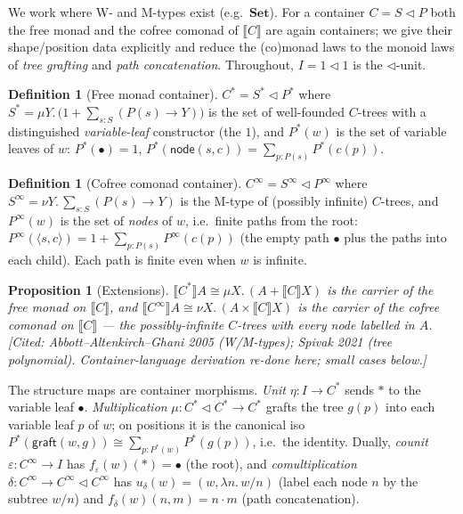 \documentclass[11pt,a4paper]{book}
\newcommand{\Set}{\mathbf{Set}}
\newcommand{\cont}[2]{#1 \triangleleft #2}
\newcommand{\Ext}[1]{\llbracket #1 \rrbracket}
\theoremstyle{plain}
\newtheorem{Proposition}[Theorem]{Proposition}
\theoremstyle{definition}
\newtheorem{Definition}[Theorem]{Definition}
\theoremstyle{remark}
\newcommand{\prov}[1]{\hfill\textsf{\footnotesize[#1]}}
\begin{document}
We work where W- and M-types exist (e.g.\ $\Set$). For a container $C=\cont SP$ both
the free monad and the cofree comonad of $\Ext C$ are again containers; we give their
shape/position data explicitly and reduce the (co)monad laws to the monoid laws of
\emph{tree grafting} and \emph{path concatenation}. Throughout, $I=\cont 11$ is the
$\triangleleft$-unit.

\begin{Definition}[Free monad container]\label{def:freemonad}
$C^{*}=\cont{S^{*}}{P^{*}}$ where
$S^{*}=\mu Y.\,\bigl(1+\textstyle\sum_{s:S}(P(s)\to Y)\bigr)$ is the set of well-founded
$C$-trees with a distinguished \emph{variable-leaf} constructor (the $1$), and $P^{*}(w)$
is the set of variable leaves of $w$:
$P^{*}(\bullet)=1$, $P^{*}(\mathsf{node}(s,c))=\sum_{p:P(s)}P^{*}(c(p))$.
\end{Definition}

\begin{Definition}[Cofree comonad container]\label{def:cofreecomonad}
$C^{\infty}=\cont{S^{\infty}}{P^{\infty}}$ where
$S^{\infty}=\nu Y.\,\textstyle\sum_{s:S}(P(s)\to Y)$ is the M-type of (possibly infinite)
$C$-trees, and $P^{\infty}(w)$ is the set of \emph{nodes} of $w$, i.e.\ finite paths from the
root: $P^{\infty}(\langle s,c\rangle)=1+\sum_{p:P(s)}P^{\infty}(c(p))$ (the empty path
$\bullet$ plus the paths into each child). Each path is finite even when $w$ is infinite.
\end{Definition}

\begin{Proposition}[Extensions]\label{prop:freecofree-ext}
$\Ext{C^{*}}A\cong\mu X.\,(A+\Ext C X)$ is the carrier of the free monad on $\Ext C$, and
$\Ext{C^{\infty}}A\cong\nu X.\,(A\times\Ext C X)$ is the carrier of the cofree comonad on
$\Ext C$ --- the possibly-infinite $C$-trees with \emph{every node} labelled in $A$.
\prov{Cited: Abbott--Altenkirch--Ghani 2005 (W/M-types); Spivak 2021 (tree polynomial).
Container-language derivation re-done here; small cases below.}
\end{Proposition}

The structure maps are container morphisms.
\emph{Unit} $\eta:I\to C^{*}$ sends $\ast$ to the variable leaf $\bullet$.
\emph{Multiplication} $\mu:C^{*}\triangleleft C^{*}\to C^{*}$ grafts the tree $g(p)$ into each
variable leaf $p$ of $w$; on positions it is the canonical iso
$P^{*}(\mathsf{graft}(w,g))\cong\sum_{p:P^{*}(w)}P^{*}(g(p))$, i.e.\ the identity.
Dually, \emph{counit} $\varepsilon:C^{\infty}\to I$ has $f_{\varepsilon}(w)(\ast)=\bullet$
(the root), and \emph{comultiplication} $\delta:C^{\infty}\to C^{\infty}\triangleleft
C^{\infty}$ has $u_{\delta}(w)=(w,\lambda n.\,w/n)$ (label each node $n$ by the subtree $w/n$)
and $f_{\delta}(w)(n,m)=n\cdot m$ (path concatenation).
\end{document}
